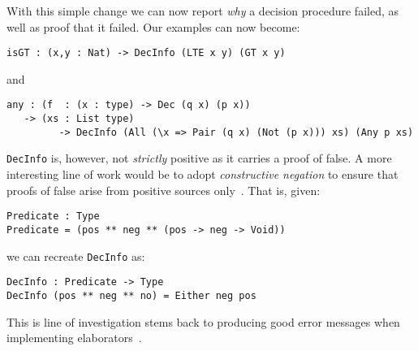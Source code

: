 With this simple change we can now report \emph{why} a decision procedure failed, as well as proof that it failed.
Our examples can now become:

\begin{verbatim}
isGT : (x,y : Nat) -> DecInfo (LTE x y) (GT x y)
\end{verbatim}

\noindent
and

\begin{verbatim}
any : (f  : (x : type) -> Dec (q x) (p x))
   -> (xs : List type)
         -> DecInfo (All (\x => Pair (q x) (Not (p x))) xs) (Any p xs)
\end{verbatim}


\texttt{DecInfo} is, however, not \emph{strictly} positive as it carries a proof of false.
A more interesting line of work would be to adopt \emph{constructive negation} to ensure that proofs of false arise from positive sources only~\cite{msfp/Atkey22}.
That is, given:

\begin{verbatim}
Predicate : Type
Predicate = (pos ** neg ** (pos -> neg -> Void))
\end{verbatim}

we can recreate \texttt{DecInfo} as:

\begin{verbatim}
DecInfo : Predicate -> Type
DecInfo (pos ** neg ** no) = Either neg pos
\end{verbatim}

This is line of investigation stems back to
producing good error messages when implementing
elaborators~\cite{DBLP:journals/jfp/McBrideM04}.

